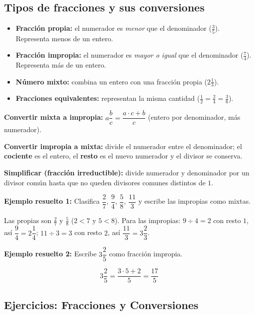 \documentclass[12pt, letterpaper]{article}
\begin{document}
\subsection{Tipos de fracciones y sus conversiones}

\begin{cuadroteoria}
  \begin{itemize}[leftmargin=*]
    \item \textbf{Fracción propia:} el numerador es \emph{menor} que el denominador ($\frac{3}{5}$). Representa menos de un entero.
    \item \textbf{Fracción impropia:} el numerador es \emph{mayor o igual} que el denominador ($\frac{7}{4}$). Representa más de un entero.
    \item \textbf{Número mixto:} combina un entero con una fracción propia ($2\frac{1}{3}$).
    \item \textbf{Fracciones equivalentes:} representan la misma cantidad ($\frac{1}{2} = \frac{2}{4} = \frac{3}{6}$).
  \end{itemize}
\end{cuadroteoria}

\begin{cuadropasos}
  \textbf{Convertir mixta a impropia:} $a\dfrac{b}{c} = \dfrac{a \cdot c + b}{c}$ \quad (entero por denominador, más numerador).

  \textbf{Convertir impropia a mixta:} divide el numerador entre el denominador; el \textbf{cociente} es el entero, el \textbf{resto} es el nuevo numerador y el divisor se conserva.

  \textbf{Simplificar (fracción irreductible):} divide numerador y denominador por un divisor común hasta que no queden divisores comunes distintos de $1$.
\end{cuadropasos}

\noindent\textbf{Ejemplo resuelto 1:} Clasifica $\dfrac{2}{7}$, $\dfrac{9}{4}$, $\dfrac{5}{8}$, $\dfrac{11}{3}$ y escribe las impropias como mixtas.

Las propias son $\frac{2}{7}$ y $\frac{5}{8}$ ($2<7$ y $5<8$). Para las impropias: $9 \div 4 = 2$ con resto $1$, así $\dfrac{9}{4} = 2\dfrac{1}{4}$; \quad $11 \div 3 = 3$ con resto $2$, así $\dfrac{11}{3} = 3\dfrac{2}{3}$.

\noindent\textbf{Ejemplo resuelto 2:} Escribe $3\dfrac{2}{5}$ como fracción impropia.

$$3\frac{2}{5} = \frac{3 \cdot 5 + 2}{5} = \frac{17}{5}$$

\subsection{Ejercicios: Fracciones y Conversiones}
\end{document}
